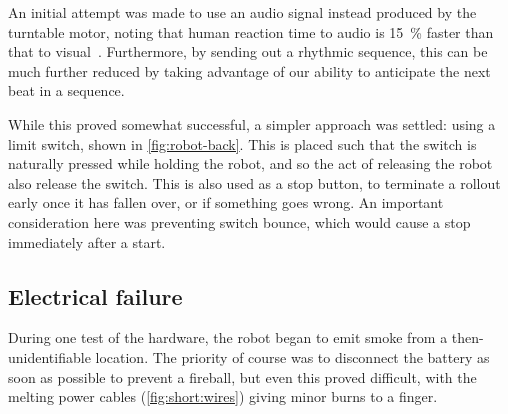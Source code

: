 \documentclass[main.tex]{subfiles}
\begin{document}
	An initial attempt was made to use an audio signal instead produced by the turntable motor, noting that human reaction time to audio is \SI{15}{\percent} faster than that to visual~\cite{reaction}.
	Furthermore, by sending out a rhythmic sequence, this can be much further reduced by taking advantage of our ability to anticipate the next beat in a sequence.

	While this proved somewhat successful, a simpler approach was settled: using a limit switch, shown in \cref{fig:robot-back}.
	This is placed such that the switch is naturally pressed while holding the robot, and so the act of releasing the robot also release the switch.
	This is also used as a stop button, to terminate a rollout early once it has fallen over, or if something goes wrong\footnotemark.
	An important consideration here was preventing switch bounce, which would cause a stop immediately after a start.


\subsection{Electrical failure}
	\label{sec:electrical:failure}

	During one test of the hardware, the robot began to emit smoke from a then-unidentifiable location. The priority of course was to disconnect the battery as soon as possible to prevent a fireball, but even this proved difficult, with the melting power cables (\cref{fig:short:wires}) giving minor burns to a finger.
\end{document}
